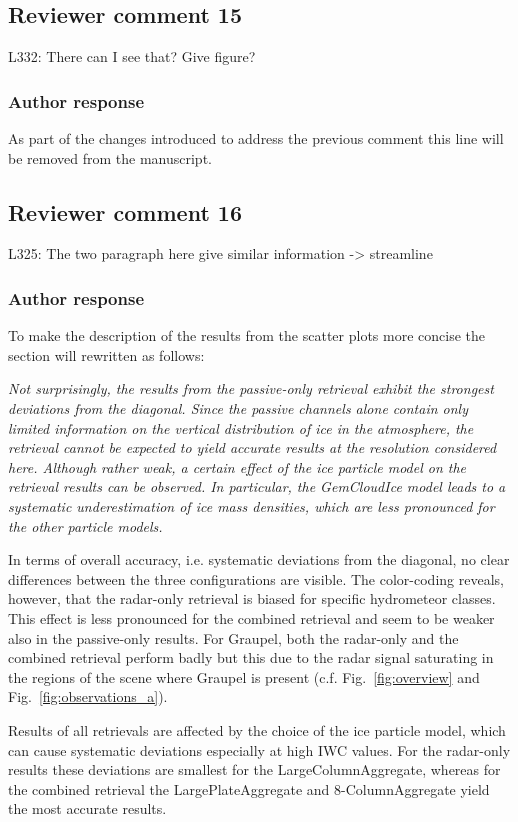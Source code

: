 \documentclass[11pt]{scrartcl}
\begin{document}
\subsection*{Reviewer comment 15}
L332: There can I see that? Give figure?

\subsubsection*{Author response}

As part of the changes introduced to address the previous comment
this line will be removed from the manuscript.

\subsection*{Reviewer comment 16}
L325: The two paragraph here give similar information -> streamline

\subsubsection*{Author response}

To make the description of the results from the scatter plots more
concise the section will rewritten as follows:

{\itshape
Not surprisingly, the results from the
passive-only retrieval exhibit the strongest deviations from the diagonal. Since
the passive channels alone contain only limited information on the vertical
distribution of ice in the atmosphere, the retrieval cannot be expected to yield
accurate results at the resolution considered here. Although rather weak, a
certain effect of the ice particle model on the retrieval results can be
observed. In particular, the GemCloudIce model leads to a systematic
underestimation of ice mass densities, which are less pronounced for the other
particle models.

In terms of overall accuracy, i.e. systematic deviations from the diagonal, no
clear differences between the three configurations are visible. The color-coding
reveals, however, that the radar-only retrieval is biased for specific
hydrometeor classes. This effect is less pronounced for the combined retrieval
and seem to be weaker also in the passive-only results. For Graupel, both the
radar-only and the combined retrieval perform badly but this due to the radar
signal saturating in the regions of the scene where Graupel is present (c.f.
Fig.~\ref{fig:overview} and Fig.~\ref{fig:observations_a}).

Results of all retrievals are affected by the choice of the ice particle model,
which can cause systematic deviations especially at high IWC values. For the
radar-only results these deviations are smallest for the LargeColumnAggregate,
whereas for the combined retrieval the LargePlateAggregate and 8-ColumnAggregate
yield the most accurate results.}
\end{document}
